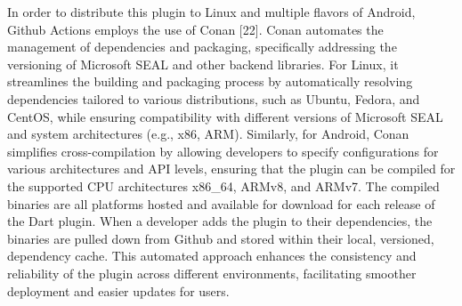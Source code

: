 In order to distribute this plugin to Linux and multiple flavors of Android, Github Actions employs the use of Conan [22]. Conan automates the management of dependencies and packaging, specifically addressing the versioning of Microsoft SEAL and other backend libraries. For Linux, it streamlines the building and packaging process by automatically resolving dependencies tailored to various distributions, such as Ubuntu, Fedora, and CentOS, while ensuring compatibility with different versions of Microsoft SEAL and system architectures (e.g., x86, ARM). Similarly, for Android, Conan simplifies cross-compilation by allowing developers to specify configurations for various architectures and API levels, ensuring that the plugin can be compiled for the supported CPU architectures x86\_64, ARMv8, and ARMv7. The compiled binaries are all platforms hosted and available for download for each release of the Dart plugin. When a developer adds the plugin to their dependencies, the binaries are pulled down from Github and stored within their local, versioned, dependency cache. This automated approach enhances the consistency and reliability of the plugin across different environments, facilitating smoother deployment and easier updates for users.

